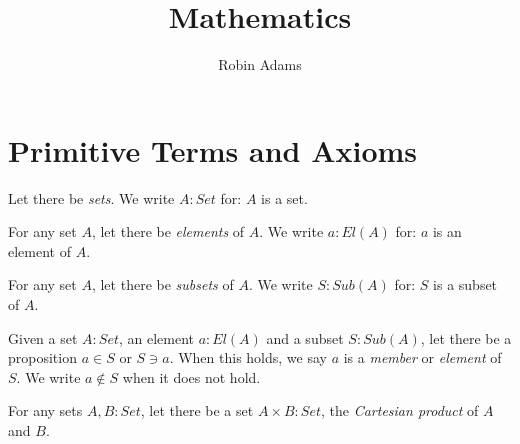\documentclass{book}
\title{Mathematics}
\author{Robin Adams}
\theoremstyle{definition}
\begin{document}
\maketitle
\tableofcontents

\chapter{Primitive Terms and Axioms}

Let there be \emph{sets}. We write $A : Set$ for: $A$ is a set.

For any set $A$, let there be \emph{elements} of $A$. We write $a : El(A)$ for: $a$ is an element of $A$.

For any set $A$, let there be \emph{subsets} of $A$. We write $S : Sub(A)$ for: $S$ is a subset of $A$.

Given a set $A : Set$, an element $a : El(A)$ and a subset $S : Sub(A)$, let there be a proposition $a \in S$ or $S \ni a$. When this holds, we say $a$ is a \emph{member} or \emph{element} of $S$. We write $a \notin S$ when it does not hold.

For any sets $A, B : Set$, let there be a set $A \times B : Set$, the \emph{Cartesian product} of $A$ and $B$.
\end{document}
